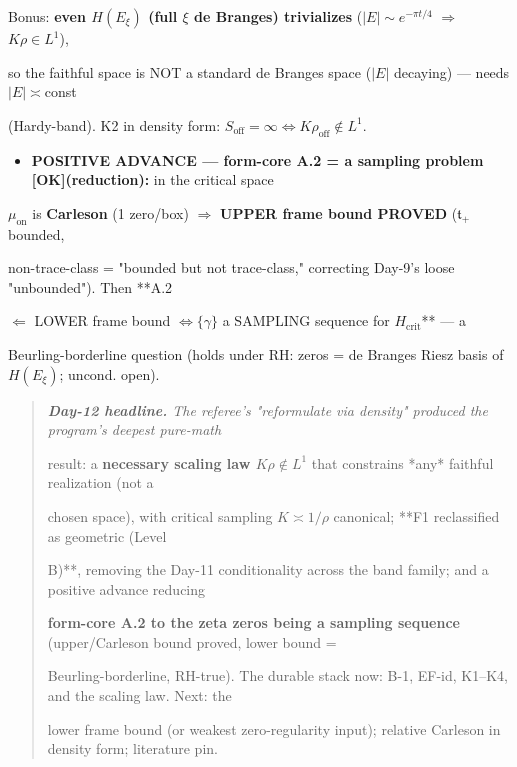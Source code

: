 \documentclass[10pt]{article}
\begin{document}
  Bonus: \textbf{even $H(E_\xi)$ (full $\xi$ de Branges) trivializes} ($|E|\sim e^{-\pi t/4}$ \ensuremath{\Rightarrow} $K\rho\in L^1$),\par
  so the faithful space is NOT a standard de Branges space ($|E|$ decaying) --- needs $|E|\asymp$const\par
  (Hardy-band). K2 in density form: $S_{\mathrm{off}}=\infty\iff K\rho_{\mathrm{off}}\notin L^1$.\par
\begin{itemize}
\item \textbf{POSITIVE ADVANCE --- form-core A.2 = a sampling problem [OK](reduction):} in the critical space
\end{itemize}
  $\mu_{\mathrm{on}}$ is \textbf{Carleson} (1 zero/box) \ensuremath{\Rightarrow} \textbf{UPPER frame bound PROVED} ($\mathfrak t_+$ bounded,\par
  non-trace-class = "bounded but not trace-class," correcting Day-9's loose "unbounded"). Then **A.2\par
  $\Leftarrow$ LOWER frame bound $\iff\{\gamma\}$ a SAMPLING sequence for $H_{\mathrm{crit}}$** --- a\par
  Beurling-borderline question (holds under RH: zeros = de Branges Riesz basis of $H(E_\xi)$; uncond. open).\par

\begin{quote}\itshape
\textbf{Day-12 headline.} The referee's "reformulate via density" produced the program's deepest pure-math\par
result: a \textbf{necessary scaling law $K\rho\notin L^1$} that constrains *any* faithful realization (not a\par
chosen space), with critical sampling $K\asymp1/\rho$ canonical; **F1 reclassified as geometric (Level\par
B)**, removing the Day-11 conditionality across the band family; and a positive advance reducing\par
\textbf{form-core A.2 to the zeta zeros being a sampling sequence} (upper/Carleson bound proved, lower bound =\par
Beurling-borderline, RH-true). The durable stack now: B-1, EF-id, K1--K4, and the scaling law. Next: the\par
lower frame bound (or weakest zero-regularity input); relative Carleson in density form; literature pin.\par
\end{quote}
\end{document}
